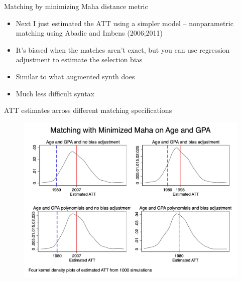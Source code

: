 \documentclass{beamer}
\begin{document}
\begin{frame}{Matching by minimizing Maha distance metric}

\begin{itemize}
\item Next I just estimated the ATT using a simpler model -- nonparametric matching using Abadie and Imbens (2006;2011)
\item It's biased when the matches aren't exact, but you can use regression adjustment to estimate the selection bias
\item Similar to what augmented synth does 
\item Much less difficult syntax
\end{itemize}

\end{frame}

\begin{frame}{ATT estimates across different matching specifications}

\begin{figure}
\begin{center}
             \includegraphics[scale=0.1]{./lecture_includes/combined_kernels_maha.jpg}
\end{center}
\end{figure}

\end{frame}
\end{document}
